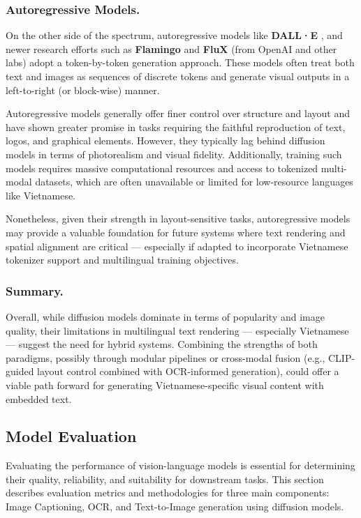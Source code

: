 \documentclass[conference]{IEEEtran}
\begin{document}
\subsubsection{Autoregressive Models.} On the other side of the spectrum, autoregressive models like \textbf{DALL·E} \cite{openai2023dalle3}, and newer research efforts such as \textbf{Flamingo} \cite{alayrac2022flamingo} and \textbf{FluX} \cite{yang2024158bitflux} (from OpenAI and other labs) adopt a token-by-token generation approach. These models often treat both text and images as sequences of discrete tokens and generate visual outputs in a left-to-right (or block-wise) manner.

Autoregressive models generally offer finer control over structure and layout and have shown greater promise in tasks requiring the faithful reproduction of text, logos, and graphical elements. However, they typically lag behind diffusion models in terms of photorealism and visual fidelity. Additionally, training such models requires massive computational resources and access to tokenized multi-modal datasets, which are often unavailable or limited for low-resource languages like Vietnamese.

Nonetheless, given their strength in layout-sensitive tasks, autoregressive models may provide a valuable foundation for future systems where text rendering and spatial alignment are critical — especially if adapted to incorporate Vietnamese tokenizer support and multilingual training objectives.

\subsubsection{Summary.} Overall, while diffusion models dominate in terms of popularity and image quality, their limitations in multilingual text rendering — especially Vietnamese — suggest the need for hybrid systems. Combining the strengths of both paradigms, possibly through modular pipelines or cross-modal fusion (e.g., CLIP-guided layout control combined with OCR-informed generation), could offer a viable path forward for generating Vietnamese-specific visual content with embedded text.

\subsection{Model Evaluation}

Evaluating the performance of vision-language models is essential for determining their quality, reliability, and suitability for downstream tasks. This section describes evaluation metrics and methodologies for three main components: Image Captioning, OCR, and Text-to-Image generation using diffusion models.
\end{document}

